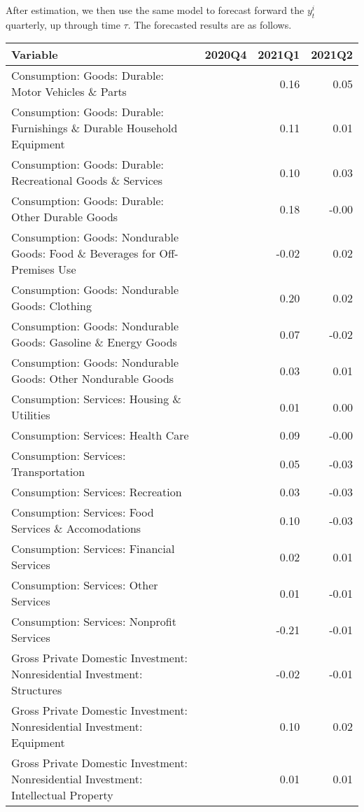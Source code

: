 \documentclass[11pt, letterpaper]{article}\usepackage[]{graphicx}\usepackage[]{color}
\begin{document}
After estimation, we then use the same model to forecast forward the $y^i_t$ quarterly, up through time $\tau$. 
The forecasted results are as follows.
\begin{table}[H]
\centering
\begingroup\scriptsize
\begin{tabular}{lrrr}
  \hline
Variable & 2020Q4 & 2021Q1 & 2021Q2 \\ 
  \hline
Consumption: Goods: Durable: Motor Vehicles \& Parts &  & 0.16 & 0.05 \\ 
  Consumption: Goods: Durable: Furnishings \& Durable Household Equipment &  & 0.11 & 0.01 \\ 
  Consumption: Goods: Durable: Recreational Goods \& Services &  & 0.10 & 0.03 \\ 
  Consumption: Goods: Durable: Other Durable Goods &  & 0.18 & -0.00 \\ 
  Consumption: Goods: Nondurable Goods: Food \& Beverages for Off-Premises Use &  & -0.02 & 0.02 \\ 
  Consumption: Goods: Nondurable Goods: Clothing &  & 0.20 & 0.02 \\ 
  Consumption: Goods: Nondurable Goods: Gasoline \& Energy Goods &  & 0.07 & -0.02 \\ 
  Consumption: Goods: Nondurable Goods: Other Nondurable Goods &  & 0.03 & 0.01 \\ 
  Consumption: Services: Housing \& Utilities &  & 0.01 & 0.00 \\ 
  Consumption: Services: Health Care &  & 0.09 & -0.00 \\ 
  Consumption: Services: Transportation &  & 0.05 & -0.03 \\ 
  Consumption: Services: Recreation &  & 0.03 & -0.03 \\ 
  Consumption: Services: Food Services \& Accomodations &  & 0.10 & -0.03 \\ 
  Consumption: Services: Financial Services &  & 0.02 & 0.01 \\ 
  Consumption: Services: Other Services &  & 0.01 & -0.01 \\ 
  Consumption: Services: Nonprofit Services &  & -0.21 & -0.01 \\ 
  Gross Private Domestic Investment: Nonresidential Investment: Structures &  & -0.02 & -0.01 \\ 
  Gross Private Domestic Investment: Nonresidential Investment: Equipment &  & 0.10 & 0.02 \\ 
  Gross Private Domestic Investment: Nonresidential Investment: Intellectual Property &  & 0.01 & 0.01 \\ 

\end{tabular}
\end{table}
\end{document}
